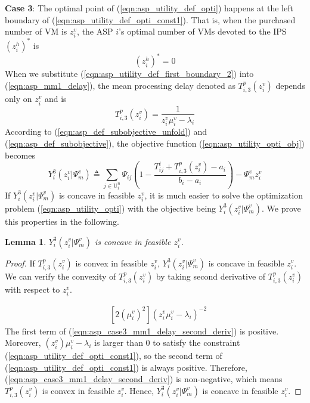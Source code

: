 \documentclass[conference]{IEEEtran}
\newtheorem{lemma}{Lemma}
\begin{document}
\textbf{Case 3}: The optimal point of (\ref{eqn:asp_utility_def_opti}) happens at the left boundary of (\ref{eqn:asp_utility_def_opti_const1}). That is, when the purchased number of VM is $z_i^v$, the ASP $i$'s optimal number of VMs devoted to the IPS $(z_i^h)^*$ is
\begin{equation} \label{eqn:asp_utility_def_first_boundary_2}
(z_i^h)^* = 0
\end{equation}
When we substitute (\ref{eqn:asp_utility_def_first_boundary_2}) into (\ref{eqn:asp_mm1_delay}), the mean processing delay denoted as $T_{i,3}^p(z_i^v)$ depends only on $z_i^v$ and is
\begin{equation}\label{eqn:asp_case3_mm1_delay}
T_{i,3}^p(z_i^v) = \frac{1}{z_i^v \mu_i^v-\lambda_i}
\end{equation}
According to (\ref{eqn:asp_def_subobjective_unfold}) and (\ref{eqn:asp_def_subobjective}), the objective function (\ref{eqn:asp_utility_opti_obj}) becomes
\begin{equation}\label{eqn:asp_case3_objective}
Y_i^3(z_i^v|\Psi_m^v) \triangleq \sum_{j \in \mathrm{U}_i^n}\Psi_{ij}(1-\frac{T_{ij}^t + T_{i,3}^p(z_i^v)-a_i}{b_i-a_i}) - \Psi_m^vz_i^v
\end{equation}
If $Y_i^3(z_i^v|\Psi_m^v)$ is concave in feasible $z_i^v$, it is much easier to solve the optimization problem (\ref{eqn:asp_utility_opti}) with the objective being $Y_i^3(z_i^v|\Psi_m^v)$. We prove this properties in the following.
\begin{lemma} \label{lemma:asp_case3_utility_concave}
$Y_i^3(z_i^v|\Psi_m^v)$ is concave in feasible $z_i^v$.
\end{lemma}
\begin{proof}
If $T_{i,3}^p(z_i^v)$ is convex in feasible $z_i^v$, $Y_i^3(z_i^v|\Psi_m^v)$ is concave in feasible $z_i^v$. We can verify the convexity of $T_{i,3}^p(z_i^v)$ by taking second derivative of $T_{i,3}^p(z_i^v)$ with respect to $z_i^v$.

\begin{equation} \label{eqn:asp_case3_mm1_delay_second_deriv}
\begin{aligned}
&[2(\mu_i^v)^2](z_i^v\mu_i^v-\lambda_i)^{-2}
\end{aligned}
\end{equation}
The first term of (\ref{eqn:asp_case3_mm1_delay_second_deriv}) is positive. Moreover, $(z_i^v)\mu_i^v - \lambda_i$ is larger than $0$ to satisfy the constraint (\ref{eqn:asp_utility_def_opti_const1}), so the second term of (\ref{eqn:asp_utility_def_opti_const1}) is always positive. Therefore, (\ref{eqn:asp_case3_mm1_delay_second_deriv}) is non-negative, which means $T_{i,3}^p(z_i^v)$ is convex in feasible $z_i^v$. Hence, $Y_i^3(z_i^v|\Psi_m^v)$ is concave in feasible $z_i^v$. \qedhere
\end{proof}
\end{document}

